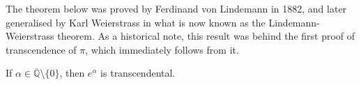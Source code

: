 The theorem below was proved by Ferdinand von Lindemann in 1882, and later generalised by Karl Weierstrass in what is now known as the Lindemann-Weierstrass theorem. As a historical note, this result was behind the first proof of transcendence of $\pi$, which immediately follows from it.

\begin{theorem}[Lindemann]
If $\alpha \in \overline{\mathbb{Q}} \setminus \lbrace 0 \rbrace$, then $e^{\alpha}$ is transcendental.
\end{theorem}
